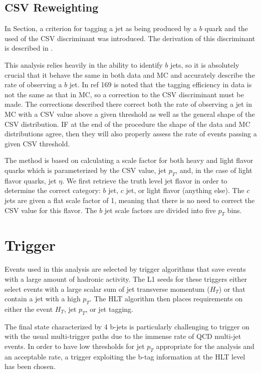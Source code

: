 \subsection{CSV Reweighting}

In Section, a criterion for tagging a jet as being produced by a $b$ quark and the used of the CSV discriminant was introduced. The derivation of this discriminant is described in .%

This analysis relies heavily in the ability to identify $b$ jets, so it is absolutely crucial that it behave the same in both data and MC and accurately describe the rate of observing a $b$ jet. In ref 169 is noted that the tagging efficiency in data is not the same as that in MC, so a correction to the CSV discriminant must be made. The corrections described there correct both the rate of observing a jet in MC with a CSV value above a given threshold as well as the general shape of the CSV distribution. IF at the end of the procedure the shape of the data and MC distributions agree, then they will also properly assess the rate of events passing a given CSV threshold.

The method is based on calculating a scale factor for both heavy and light flavor quarks which is parameterized by the CSV value, jet $p_{T}$, and, in the case of light flavor quarks, jet $\eta$. We first retrieve the truth level jet flavor in order to determine the correct category: $b$ jet, $c$ jet, or light flavor (anything else). The $c$ jets are given a flat scale factor of 1, meaning that there is no need to correct the CSV value for this flavor. The $b$ jet scale factors are divided into five $p_{T}$ bins.

\section{Trigger \label{sec:trigger}}

Events used in this analysis are selected by trigger algorithms that save events with a large amount of hadronic activity. The L1 seeds for these triggers either select events with a large scalar sum of jet transverse momentum ($H_{T}$) or that contain a jet with a high $p_{T}$. The HLT algorithm then places requirements on either the event $H_{T}$, jet $p_{T}$, or jet tagging. 

The final state characterized by 4 b-jets is particularly challenging to trigger on with the usual multi-trigger paths due to the immense rate of QCD multi-jet events. In order to have low thresholds for jet $p_{T}$ appropriate for the analysis and an acceptable rate, a trigger exploiting the b-tag information at the HLT level has been chosen.


